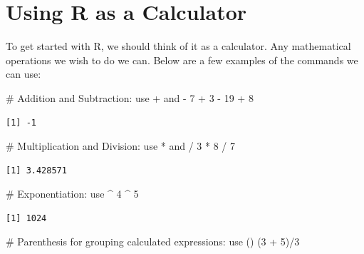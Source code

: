 \documentclass[
  letterpaper,
  DIV=11,
  numbers=noendperiod]{scrreprt}
\newenvironment{Shaded}{\begin{snugshade}}{\end{snugshade}}
\newcommand{\CommentTok}[1]{\textcolor[rgb]{0.37,0.37,0.37}{#1}}
\newcommand{\DecValTok}[1]{\textcolor[rgb]{0.68,0.00,0.00}{#1}}
\newcommand{\NormalTok}[1]{\textcolor[rgb]{0.00,0.23,0.31}{#1}}
\newcommand{\SpecialCharTok}[1]{\textcolor[rgb]{0.37,0.37,0.37}{#1}}
\begin{document}
\section{Using R as a Calculator}\label{using-r-as-a-calculator}

To get started with R, we should think of it as a calculator. Any
mathematical operations we wish to do we can. Below are a few examples
of the commands we can use:

\begin{Shaded}
\begin{Highlighting}[]
\CommentTok{\# Addition and Subtraction: use + and {-}}
\DecValTok{7} \SpecialCharTok{+} \DecValTok{3} \SpecialCharTok{{-}} \DecValTok{19} \SpecialCharTok{+} \DecValTok{8}
\end{Highlighting}
\end{Shaded}

\begin{verbatim}
[1] -1
\end{verbatim}

\begin{Shaded}
\begin{Highlighting}[]
\CommentTok{\# Multiplication and Division: use * and /}
\DecValTok{3} \SpecialCharTok{*} \DecValTok{8} \SpecialCharTok{/} \DecValTok{7}
\end{Highlighting}
\end{Shaded}

\begin{verbatim}
[1] 3.428571
\end{verbatim}

\begin{Shaded}
\begin{Highlighting}[]
\CommentTok{\# Exponentiation: use \^{}}
\DecValTok{4} \SpecialCharTok{\^{}} \DecValTok{5}
\end{Highlighting}
\end{Shaded}

\begin{verbatim}
[1] 1024
\end{verbatim}

\begin{Shaded}
\begin{Highlighting}[]
\CommentTok{\# Parenthesis for grouping calculated expressions: use ()}
\NormalTok{(}\DecValTok{3} \SpecialCharTok{+} \DecValTok{5}\NormalTok{)}\SpecialCharTok{/}\DecValTok{3}
\end{Highlighting}
\end{Shaded}
\end{document}
